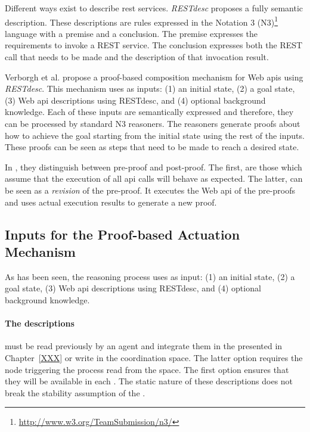Different ways exist to describe \ac{rest} services. %
\emph{RESTdesc} \cite{verborgh_wsrest_2012} proposes a fully semantic description.
These descriptions are rules expressed in the Notation 3 (N3)\footnote{\url{http://www.w3.org/TeamSubmission/n3/}} language with a premise and a conclusion.
The premise expresses the requirements to invoke a REST service.
The conclusion expresses both the REST call that needs to be made and the description of that invocation result.


Verborgh et al. \cite{verborgh_ijcs_2014} propose a proof-based composition mechanism for Web \acp{api} using \emph{RESTdesc}.
This mechanism uses as inputs:
(1) an initial state,
(2) a goal state,
(3) Web \ac{api} descriptions using RESTdesc, and
(4) optional background knowledge.
Each of these inputs are semantically expressed and therefore, they can be processed by standard N3 reasoners.
The reasoners generate proofs about how to achieve the goal starting from the initial state using the rest of the inputs.
These proofs can be seen as steps that need to be made to reach a desired state.


In \cite{verborgh_ijcs_2014}, they distinguish between pre-proof and post-proof.
The first, are those which assume that the execution of all \acs{api} calls will behave as expected.
The latter, can be seen as a \emph{revision} of the pre-proof.
It executes the Web \acs{api} of the pre-proofs and uses actual execution results to generate a new proof.



\subsection{Inputs for the Proof-based Actuation Mechanism}

As has been seen, the reasoning process uses as input:
(1) an initial state,
(2) a goal state,
(3) Web \ac{api} descriptions using RESTdesc, and
(4) optional background knowledge.


\paragraph{The descriptions} must be read previously by an agent and integrate them in the \clues{} presented in Chapter~\ref{XXX} or write in the coordination space.
The latter option requires the node triggering the process read from the space.
The first option ensures that they will be available in each \consumer{}.
The static nature of these descriptions does not break the stability assumption of the \clues{}.


